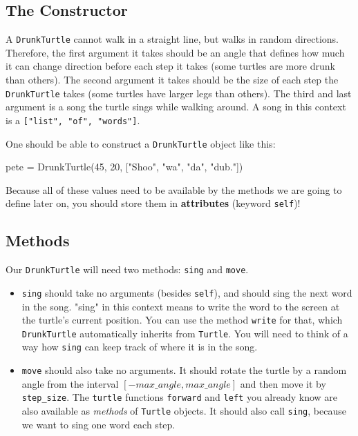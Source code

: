 
\subsection{The Constructor}

A {\tt DrunkTurtle} cannot walk in a straight line, but walks in random directions. Therefore, the first argument it takes should be an angle that defines how much it can change direction before each step it takes (some turtles are more drunk than others). The second argument it takes should be the size of each step the {\tt DrunkTurtle} takes (some turtles have larger legs than others). The third and last argument is a song the turtle sings while walking around. A song in this context is a {\tt ["list", "of", "words"]}.

\vspace{1em}

\noindent One should be able to construct a {\tt DrunkTurtle} object like this:

\begin{pythoncode}
pete = DrunkTurtle(45, 20, ["Shoo", "wa", "da", "dub."])
\end{pythoncode}

\noindent Because all of these values need to be available by the methods we are going to define later on, you should store them in {\bf attributes} (keyword \texttt{self})!


\subsection{Methods}

Our {\tt DrunkTurtle} will need two methods: {\tt sing} and {\tt move}.

\begin{itemize}
    \item {\tt sing} should take no arguments (besides {\tt self}), and should sing the next word in the song. "sing" in this context means to write the word to the screen at the turtle's current position. You can use the method {\tt write} for that, which {\tt DrunkTurtle} automatically inherits from {\tt Turtle}. You will need to think of a way how {\tt sing} can keep track of where it is in the song.

    \item {\tt move} should also take no arguments. It should rotate the turtle by a random angle from the interval $[-max\_angle, max\_angle]$ and then move it by {\tt step\_size}. The {\tt turtle} functions {\tt forward} and {\tt left} you already know are also available as {\it methods} of {\tt Turtle} objects. It should also call {\tt sing}, because we want to sing one word each step.
\end{itemize}

